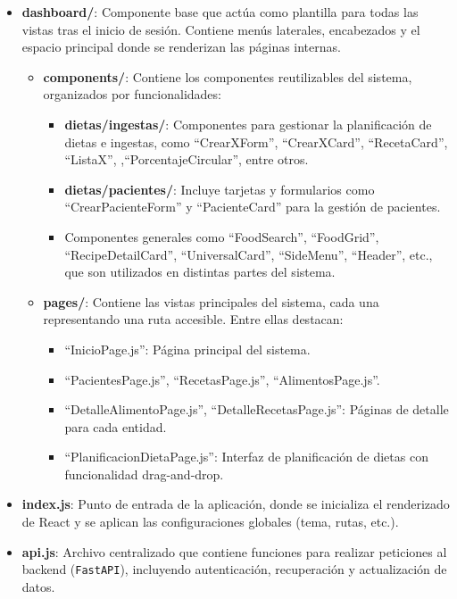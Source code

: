 \begin{itemize}
\begin{itemize}
        \item \textbf{dashboard/}: Componente base que actúa como plantilla para todas las vistas tras el inicio de sesión. Contiene menús laterales, encabezados y el espacio principal donde se renderizan las páginas internas.
        \begin{itemize}
            \item \textbf{components/}: Contiene los componentes reutilizables del sistema, organizados por funcionalidades:
            \begin{itemize}
                \item \textbf{dietas/ingestas/}: Componentes para gestionar la planificación de dietas e ingestas, como ``CrearXForm'', ``CrearXCard'', ``RecetaCard'', ``ListaX'', ,``PorcentajeCircular'', entre otros.
                \item \textbf{dietas/pacientes/}: Incluye tarjetas y formularios como ``CrearPacienteForm'' y ``PacienteCard'' para la gestión de pacientes.
                \item Componentes generales como ``FoodSearch'', ``FoodGrid'', ``RecipeDetailCard'', ``UniversalCard'', ``SideMenu'', ``Header'', etc., que son utilizados en distintas partes del sistema.
            \end{itemize}
            \item \textbf{pages/}: Contiene las vistas principales del sistema, cada una representando una ruta accesible. Entre ellas destacan:
            \begin{itemize}
                \item ``InicioPage.js'': Página principal del sistema.
                \item ``PacientesPage.js'', ``RecetasPage.js'', ``AlimentosPage.js''.
                \item ``DetalleAlimentoPage.js'', ``DetalleRecetasPage.js'': Páginas de detalle para cada entidad.
                \item ``PlanificacionDietaPage.js'': Interfaz de planificación de dietas con funcionalidad drag-and-drop.
            \end{itemize}
        \end{itemize}
    \item \textbf{index.js}: Punto de entrada de la aplicación, donde se inicializa el renderizado de React y se aplican las configuraciones globales (tema, rutas, etc.).

    \item \textbf{api.js}: Archivo centralizado que contiene funciones para realizar peticiones al backend (\texttt{FastAPI}), incluyendo autenticación, recuperación y actualización de datos.
    \end{itemize}
  \end{itemize}

